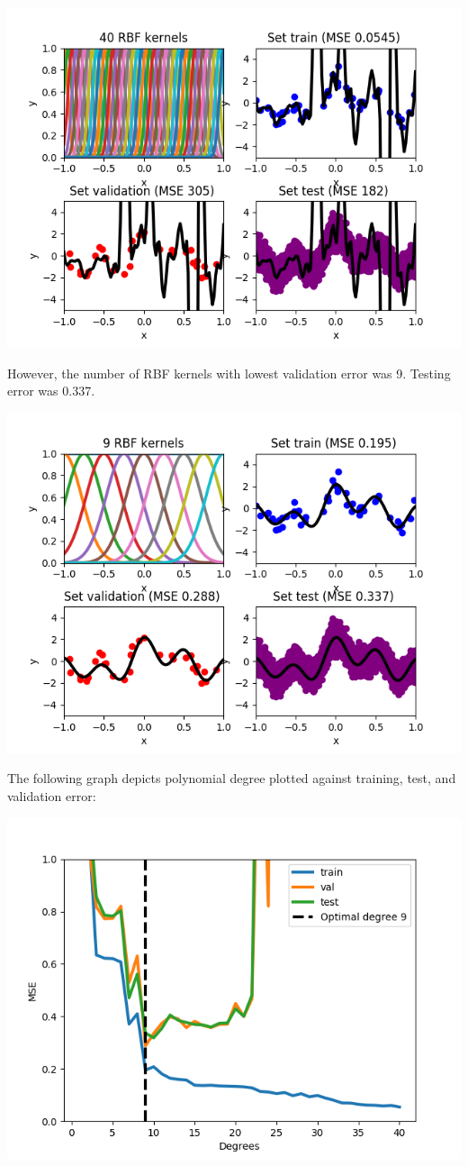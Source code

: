 \documentclass[a4paper]{article}
\begin{document}
\includegraphics[width=\textwidth]{linreg_c40.png}

However, the number of RBF kernels with lowest validation error was 9.  Testing error was 0.337.

\includegraphics[width=\textwidth]{linreg_c9.png}

The following graph depicts polynomial degree plotted against training, test, and validation error:

\includegraphics[width=\textwidth]{linreg_rbf_error.png}
\end{document}
